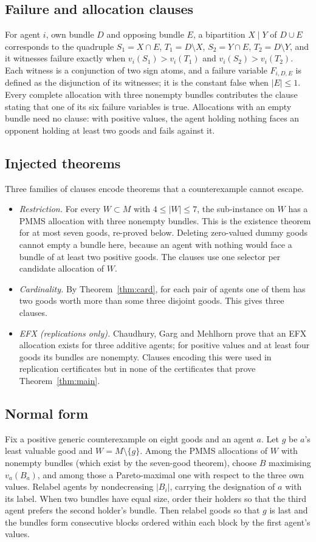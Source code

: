 \documentclass[11pt,a4paper]{article}
\theoremstyle{remark}
\begin{document}
\subsection{Failure and allocation clauses}
For agent $i$, own bundle $D$ and opposing bundle $E$, a bipartition $X\mid Y$ of $D\cup E$ corresponds to the quadruple $S_1=X\cap E$, $T_1=D\setminus X$, $S_2=Y\cap E$, $T_2=D\setminus Y$, and it witnesses failure exactly when $v_i(S_1)>v_i(T_1)$ and $v_i(S_2)>v_i(T_2)$. Each witness is a conjunction of two sign atoms, and a failure variable $F_{i,D,E}$ is defined as the disjunction of its witnesses; it is the constant false when $|E|\le1$. Every complete allocation with three nonempty bundles contributes the clause stating that one of its six failure variables is true. Allocations with an empty bundle need no clause: with positive values, the agent holding nothing faces an opponent holding at least two goods and fails against it.

\subsection{Injected theorems}
Three families of clauses encode theorems that a counterexample cannot escape.
\begin{itemize}
\item \emph{Restriction.} For every $W\subset M$ with $4\le|W|\le7$, the sub-instance on $W$ has a PMMS allocation with three nonempty bundles. This is the existence theorem for at most seven goods, re-proved below. Deleting zero-valued dummy goods cannot empty a bundle here, because an agent with nothing would face a bundle of at least two positive goods. The clauses use one selector per candidate allocation of $W$.
\item \emph{Cardinality.} By Theorem~\ref{thm:card}, for each pair of agents one of them has two goods worth more than some three disjoint goods. This gives three clauses.
\item \emph{EFX (replications only).} Chaudhury, Garg and Mehlhorn \cite{CGM24} prove that an EFX allocation exists for three additive agents; for positive values and at least four goods its bundles are nonempty. Clauses encoding this were used in replication certificates but in none of the certificates that prove Theorem~\ref{thm:main}.
\end{itemize}

\subsection{Normal form}
Fix a positive generic counterexample on eight goods and an agent $a$. Let $g$ be $a$'s least valuable good and $W=M\setminus\{g\}$. Among the PMMS allocations of $W$ with nonempty bundles (which exist by the seven-good theorem), choose $B$ maximising $v_a(B_a)$, and among those a Pareto-maximal one with respect to the three own values. Relabel agents by nondecreasing $|B_i|$, carrying the designation of $a$ with its label. When two bundles have equal size, order their holders so that the third agent prefers the second holder's bundle. Then relabel goods so that $g$ is last and the bundles form consecutive blocks ordered within each block by the first agent's values.
\end{document}
